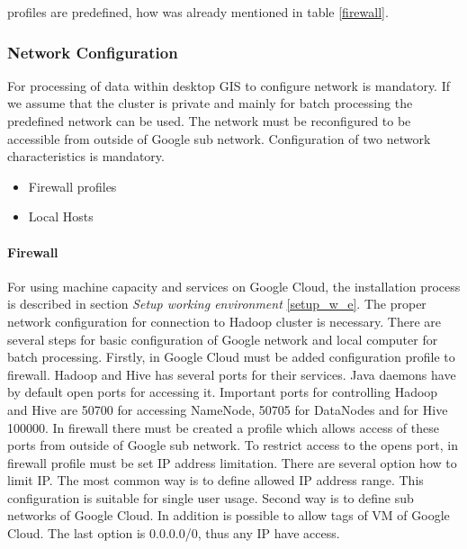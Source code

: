 \documentclass[a4paper,12pt,oneside]{report}
\begin{document}
	profiles are predefined, how was already mentioned in table \ref{firewall}.
	
	\subsubsection{Network Configuration}\label{network_cfg}
	For  processing of data within desktop GIS to configure network is mandatory. 
	If we assume that the cluster is private and mainly for batch processing the 
	predefined network can be used. The network must be reconfigured to be accessible
	from outside of Google sub network. Configuration of two network characteristics is mandatory.
	\begin{itemize}
		\item Firewall profiles
		\item Local Hosts
	\end{itemize}
	
	\paragraph{Firewall} For using machine capacity and services on Google Cloud, 
	the installation process is described in section \textit{Setup working
		environment} \ref{setup_w_e}. The proper network configuration for connection to
	Hadoop cluster is necessary. There are several steps for basic configuration of
	Google network and local computer for batch processing. Firstly, in Google Cloud
	must be added configuration profile to firewall. Hadoop and Hive has several ports
	for their services. Java daemons have by default open ports for accessing it.
	Important ports for controlling Hadoop and Hive are 50700 for accessing NameNode, 50705 for DataNodes
	and for Hive 100000. In firewall there must be created a profile which allows access of
	these ports from outside of Google sub net\-work. To restrict access to the opens port,
	in firewall profile must be set IP address limitation. There are several option
	how to limit IP. The most common way is to define allowed IP address range. This
	configuration is suitable for single user usage. Second way is to define sub
	networks of Google Cloud. In addition is possible to allow tags of VM of Google
	Cloud. The last option is  0.0.0.0/0, thus any IP have access.
	
\end{document}
